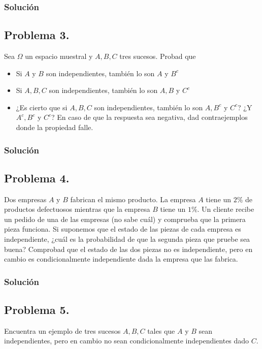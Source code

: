 \documentclass[
]{article}
\providecommand{\tightlist}{%
  \setlength{\itemsep}{0pt}\setlength{\parskip}{0pt}}
\begin{document}
\hypertarget{soluciuxf3n-17}{%
\subsubsection{Solución}\label{soluciuxf3n-17}}

\hypertarget{problema-3.}{%
\subsection{Problema 3.}\label{problema-3.}}

Sea \(\Omega\) un espacio muestral y \(A,B,C\) tres sucesos. Probad que

\begin{itemize}
\tightlist
\item
  Si \(A\) y \(B\) son independientes, también lo son \(A\) y \(B^c\)
\item
  Si \(A,B,C\) son independientes, también lo son \(A,B\) y \(C^c\)
\item
  ¿Es cierto que si \(A,B,C\) son independientes, también lo son
  \(A,B^c\) y \(C^c\)? ¿Y \(A^c, B^c\) y \(C^c\)? En caso de que la
  respuesta sea negativa, dad contraejemplos donde la propiedad falle.
\end{itemize}

\hypertarget{soluciuxf3n-18}{%
\subsubsection{Solución}\label{soluciuxf3n-18}}

\hypertarget{problema-4.}{%
\subsection{Problema 4.}\label{problema-4.}}

Dos empresas \(A\) y \(B\) fabrican el mismo producto. La empresa \(A\)
tiene un \(2\%\) de productos defectuosos mientras que la empresa \(B\)
tiene un \(1\%\). Un cliente recibe un pedido de una de las empresas (no
sabe cuál) y comprueba que la primera pieza funciona. Si suponemos que
el estado de las piezas de cada empresa es independiente, ¿cuál es la
probabilidad de que la segunda pieza que pruebe sea buena? Comprobad que
el estado de las dos piezas no es independiente, pero en cambio es
condicionalmente independiente dada la empresa que las fabrica.

\hypertarget{soluciuxf3n-19}{%
\subsubsection{Solución}\label{soluciuxf3n-19}}

\hypertarget{problema-5.}{%
\subsection{Problema 5.}\label{problema-5.}}

Encuentra un ejemplo de tres sucesos \(A,B,C\) tales que \(A\) y \(B\)
sean independientes, pero en cambio no sean condicionalmente
independientes dado \(C\).
\end{document}
